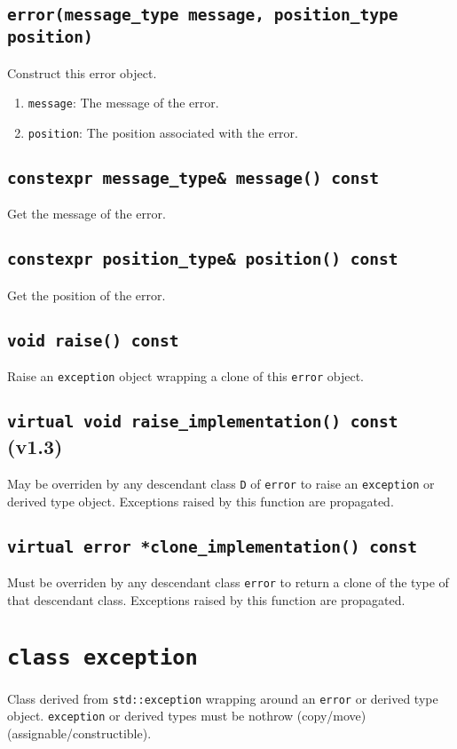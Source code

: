 \documentclass[oneside]{book}
\begin{document}
\subsection{\texttt{error(message\_type message, position\_type position)}}
Construct this error object.
\begin{enumerate}
	\item\texttt{message}: The message of the error.
	\item\texttt{position}: The position associated with the error.
\end{enumerate}

\subsection{\texttt{constexpr message\_type\& message() const}}
Get the message of the error.

\subsection{\texttt{constexpr position\_type\& position() const}}
Get the position of the error.

\subsection{\texttt{void raise() const}}
Raise an \texttt{exception} object wrapping a clone of this \texttt{error} object.

\subsection{\texttt{virtual void raise\_implementation() const} (v1.3)}
May be overriden by any descendant class \texttt{D} of \texttt{error} to raise an
\texttt{exception} or derived type object.
Exceptions raised by this function are propagated.

\subsection{\texttt{virtual error *clone\_implementation() const}}
Must be overriden by any descendant class \texttt{error} to return a clone of the type of that descendant class.
Exceptions raised by this function are propagated.
\section{\texttt{class exception}}
Class derived from \texttt{std::exception} wrapping around an \texttt{error} or derived type
object. \texttt{exception} or derived types must be nothrow (copy/move) (assignable/constructible).
\end{document}
